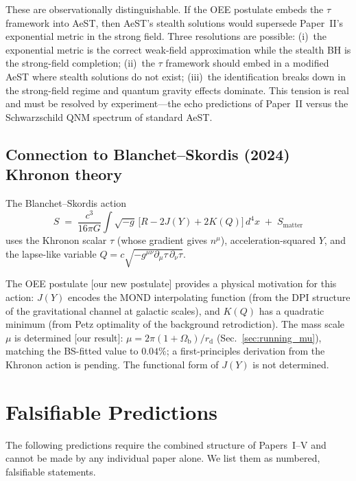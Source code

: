 \documentclass[prd,twocolumn,superscriptaddress,longbibliography,floatfix]{revtex4-2}
\newcommand{\tauasym}{\tau}
\begin{document}
These are observationally distinguishable.
If the OEE postulate embeds the $\tauasym$ framework
into AeST, then AeST's stealth solutions would supersede
Paper~II's exponential metric in the strong field.  Three
resolutions are possible:
(i)~the exponential metric is the correct weak-field
approximation while the stealth BH is the strong-field
completion;
(ii)~the $\tauasym$ framework should embed in a modified
AeST where stealth solutions do not exist;
(iii)~the identification breaks down in the strong-field
regime and quantum gravity effects dominate.
This tension is real and must be resolved by
experiment---the echo predictions of Paper~II versus the
Schwarzschild QNM spectrum of standard AeST.

\subsection{Connection to Blanchet--Skordis (2024) Khronon theory}

The Blanchet--Skordis
action~\cite{BlanchetSkordis2024,BlanchetSkordis2025}
\begin{equation}
S \;=\; \frac{c^3}{16\pi G}\int\!\sqrt{-g}\,
\bigl[R - 2J(Y) + 2K(Q)\bigr]\,d^4x
\;+\; S_{\mathrm{matter}}
\label{eq:BS_action}
\end{equation}
uses the Khronon scalar $\tau$ (whose gradient gives
$n^\mu$), acceleration-squared $Y$, and the lapse-like
variable $Q = c\sqrt{-g^{\mu\nu}\partial_\mu\tau\,
\partial_\nu\tau}$.

The OEE postulate [our new postulate] provides a
physical motivation for this action: $J(Y)$ encodes
the MOND interpolating function (from the DPI structure
of the gravitational channel at galactic scales), and
$K(Q)$ has a quadratic minimum (from Petz optimality
of the background retrodiction).  The mass scale $\mu$
is determined [our result]:
$\mu = 2\pi(1+\Omega_{\mathrm{b}})/r_{\mathrm{d}}$
(Sec.~\ref{sec:running_mu}), matching the BS-fitted
value to $0.04\%$; a first-principles derivation
from the Khronon action is pending.  The functional
form of $J(Y)$ is not determined.


\section{Falsifiable Predictions}
\label{sec:predictions}

The following predictions require the combined structure
of Papers~I--V and cannot be made by any individual paper
alone.  We list them as numbered, falsifiable statements.
\end{document}
